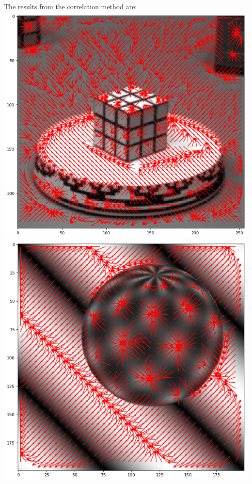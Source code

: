 \documentclass[11pt]{article}
\makeatletter
\def\maxwidth{\ifdim\Gin@nat@width>\linewidth\linewidth
    \else\Gin@nat@width\fi}
\let\Oldincludegraphics\includegraphics
\renewcommand{\includegraphics}[1]{\Oldincludegraphics[width=.8\maxwidth]{#1}}
\makeatother
\begin{document}
    The results from the correlation method are:
\includegraphics{output_16_0.png} \includegraphics{output_15_0.png}
\end{document}
